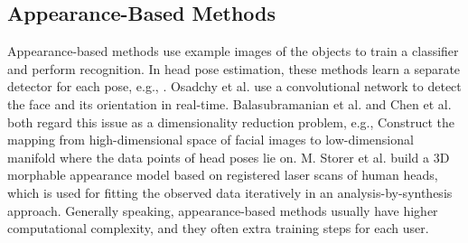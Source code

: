 \subsection{Appearance-Based Methods}
Appearance-based methods use example images of the objects to train a classifier and perform recognition. In head pose estimation, these methods learn a separate detector for each pose, e.g., \cite{Morency:03:PEU3VBE}. Osadchy et al. \cite{Osadchy:07:SFDPEEBM} use a convolutional network to detect the face and its orientation in real-time. Balasubramanian et al. \cite{Balasubramanian:07:BMEAFFPIHPE} and Chen et al. \cite{Chen:03:HPEUFML} both regard this issue as a dimensionality reduction problem, e.g., Construct the mapping from high-dimensional space of facial images to low-dimensional manifold where the data points of head poses lie on. M. Storer et al.\cite{Storer:09:3DMAM} build a 3D morphable appearance model based on registered laser scans of human heads, which is used for fitting the observed data iteratively in an analysis-by-synthesis approach. Generally speaking, appearance-based methods usually have higher computational complexity, and they often extra training steps for each user.

